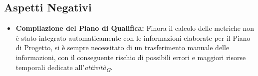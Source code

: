 \subsection{Aspetti Negativi}
\begin{itemize}
    \item \textbf{Compilazione del Piano di Qualifica:} Finora il calcolo delle metriche non è stato integrato automaticamente con le informazioni elaborate per il Piano di Progetto, si è sempre necessitato di un trasferimento manuale delle informazioni, con il conseguente rischio di possibili errori e maggiori risorse temporali dedicate all'\textit{attività}\textsubscript{\textit{G}}.
\end{itemize}